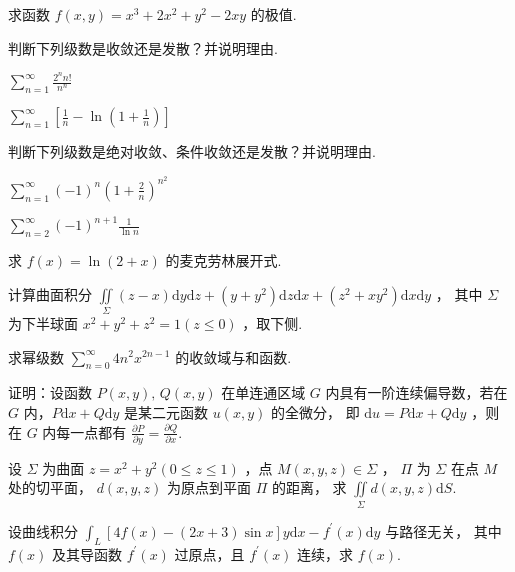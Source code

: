 \begin{problem}[points = 8]
求函数 $f(x, y) = x^3 + 2x^2 + y^2 -2xy$ 的极值.
\end{problem}

\begin{problem}[points = 8]
判断下列级数是收敛还是发散？并说明理由.
\end{problem}
\begin{calculations}[columns = 2, label = (\arabic*)]
    \item $\sum\limits_{n = 1}^{\infty} \frac{2^nn!}{n^n}$
    \item $\sum\limits_{n = 1}^{\infty} \left[\frac{1}{n} - \ln{\left(1 + \frac{1}{n}\right)}\right]$
\end{calculations}

\begin{problem}[points = 8]
判断下列级数是绝对收敛、条件收敛还是发散？并说明理由.
\end{problem}
\begin{calculations}[columns = 2, label = (\arabic*)]
    \item $\sum\limits_{n = 1}^{\infty} (-1)^n\left(1 + \frac{2}{n}\right)^{n^2}$
    \item $\sum\limits_{n = 2}^{\infty} (-1)^{n + 1}\frac{1}{\ln{n}}$
\end{calculations}

\begin{problem}[points = 8]
求 $f(x) = \ln{(2 + x)}$ 的麦克劳林展开式.
\end{problem}

\begin{problem}[points = 8]
计算曲面积分 $\iint\limits_\Sigma (z - x)\mathrm{d}y\mathrm{d}z + (y + y^2)\mathrm{d}z\mathrm{d}x + (z^2 + xy^2)\mathrm{d}x\mathrm{d}y$ ，
其中 $\Sigma$ 为下半球面 $x^2 + y^2 + z^2 = 1(z \leq 0)$ ，取下侧.
\end{problem}

\begin{problem}[points = 8]
求幂级数 $\sum\limits_{n = 0}^{\infty} 4n^2x^{2n - 1}$ 的收敛域与和函数.
\end{problem}

\begin{problem}[points = 5]
证明：设函数 $P(x, y),\, Q(x, y)$ 在单连通区域 $G$ 内具有一阶连续偏导数，若在 $G$ 内，$P\mathrm{d}x + Q\mathrm{d}y$ 是某二元函数 $u(x, y)$ 的全微分，
即 $\mathrm{d}u = P\mathrm{d}x + Q\mathrm{d}y$ ，则在 $G$ 内每一点都有 $\frac{\partial P}{\partial y} = \frac{\partial Q}{\partial x}$.
\end{problem}

\begin{problem}[points = 6]
设 $\Sigma$ 为曲面 $z = x^2 + y^2(0 \leq z \leq 1)$ ，点 $M(x, y, z) \in \Sigma$ ，
$\Pi$ 为 $\Sigma$ 在点 $M$ 处的切平面， $d(x, y, z)$ 为原点到平面 $\Pi$ 的距离，
求 $\iint\limits_\Sigma d(x, y, z)\mathrm{d}S$.
\end{problem}

\begin{problem}[points = 8]
设曲线积分 $\int_L [4f(x) - (2x + 3)\sin{x}]y\mathrm{d}x - f^{\prime}(x)\mathrm{d}y$ 与路径无关，
其中 $f(x)$ 及其导函数 $f^{\prime}(x)$ 过原点，且 $f^{\prime}(x)$ 连续，求 $f(x)$.
\end{problem}
